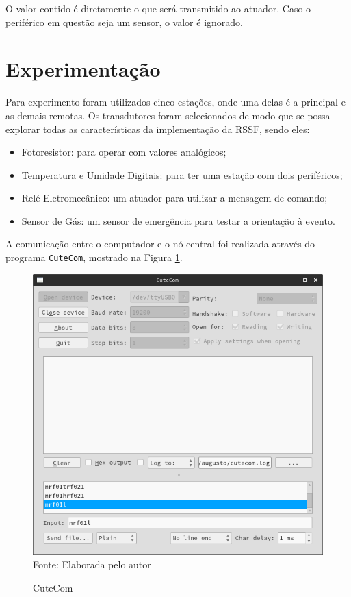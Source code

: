 {O valor contido é diretamente o que será transmitido ao atuador. Caso o periférico em questão seja
um sensor, o valor é ignorado.

\section{Experimentação}
Para experimento foram utilizados cinco estações, onde uma delas é a principal e as demais remotas. Os
transdutores foram selecionados de modo que se possa explorar todas as características da implementação da
RSSF, sendo eles:

\begin{itemize}
	\item Fotoresistor: para operar com valores analógicos;
	\item Temperatura e Umidade Digitais: para ter uma estação com dois periféricos;
	\item Relé Eletromecânico: um atuador para utilizar a mensagem de comando;
	\item Sensor de Gás: um sensor de emergência para testar a orientação à evento.
\end{itemize}

A comunicação entre o computador e o nó central foi realizada através do programa \texttt{CuteCom}, mostrado na Figura
\ref{figura:cutecom}.

\begin{figure}[h!]
	\caption{CuteCom}
	\centering
	\includegraphics[scale=0.5]{../images/cutecom.png}
	\hspace{\linewidth}
	Fonte: Elaborada pelo autor
	\label{figura:cutecom}
\end{figure}

}
